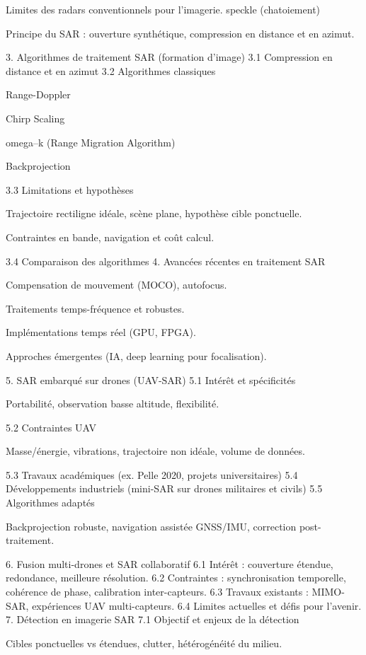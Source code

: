 Limites des radars conventionnels pour l’imagerie.
speckle (chatoiement) 

Principe du SAR : ouverture synthétique, compression en distance et en azimut.

3. Algorithmes de traitement SAR (formation d’image)
3.1 Compression en distance et en azimut
3.2 Algorithmes classiques

Range-Doppler

Chirp Scaling

omega–k (Range Migration Algorithm)

Backprojection

3.3 Limitations et hypothèses

Trajectoire rectiligne idéale, scène plane, hypothèse cible ponctuelle.

Contraintes en bande, navigation et coût calcul.

3.4 Comparaison des algorithmes
4. Avancées récentes en traitement SAR

Compensation de mouvement (MOCO), autofocus.

Traitements temps-fréquence et robustes.

Implémentations temps réel (GPU, FPGA).

Approches émergentes (IA, deep learning pour focalisation).

5. SAR embarqué sur drones (UAV-SAR)
5.1 Intérêt et spécificités

Portabilité, observation basse altitude, flexibilité.

5.2 Contraintes UAV

Masse/énergie, vibrations, trajectoire non idéale, volume de données.

5.3 Travaux académiques (ex. Pelle 2020, projets universitaires)
5.4 Développements industriels (mini-SAR sur drones militaires et civils)
5.5 Algorithmes adaptés

Backprojection robuste, navigation assistée GNSS/IMU, correction post-traitement.

6. Fusion multi-drones et SAR collaboratif
6.1 Intérêt : couverture étendue, redondance, meilleure résolution.
6.2 Contraintes : synchronisation temporelle, cohérence de phase, calibration inter-capteurs.
6.3 Travaux existants : MIMO-SAR, expériences UAV multi-capteurs.
6.4 Limites actuelles et défis pour l’avenir.
7. Détection en imagerie SAR
7.1 Objectif et enjeux de la détection

Cibles ponctuelles vs étendues, clutter, hétérogénéité du milieu.


